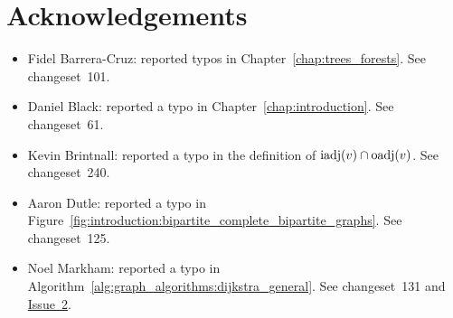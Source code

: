 
\chapter{Acknowledgements}

\begin{itemize}
\item Fidel Barrera-Cruz: reported typos in
  Chapter~\ref{chap:trees_forests}. See changeset~101.

\item Daniel Black: reported a typo in
  Chapter~\ref{chap:introduction}. See changeset~61.

\item Kevin Brintnall: reported a typo in the definition of 
  $\operatorname*{iadj}(v) \cap \operatorname*{oadj}(v)$. See changeset~240.

\item Aaron Dutle: reported a typo in
  Figure~\ref{fig:introduction:bipartite_complete_bipartite_graphs}. See
  changeset~125.

\item Noel Markham: reported a typo in
  Algorithm~\ref{alg:graph_algorithms:dijkstra_general}. See
  changeset~131 and
  \href{http://code.google.com/p/graph-theory-algorithms-book/issues/detail?id=2}{Issue~2}.
\end{itemize}

